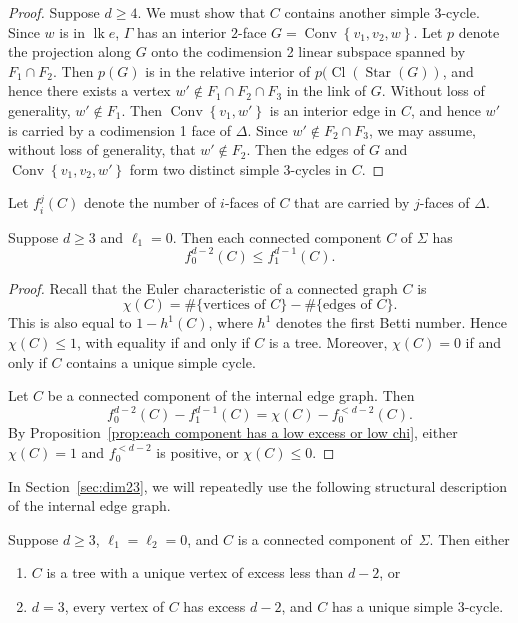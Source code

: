 \documentclass[ALCO,ThmDefs,Unicode,epreuves]{cedram}
\DeclareMathOperator{\Cl}{Cl}
\DeclareMathOperator{\Convop}{Conv}
\newcommand{\Conv}[1]{\Convop\left\{{#1}\right\}}
\DeclareMathOperator{\lk}{lk}
\DeclareMathOperator{\Star}{Star}
\begin{document}
\begin{proof}
Suppose $d \geq 4$. We must show that $C$ contains another simple $3$-cycle. 
Since $w$ is in $\lk e$, $\Gamma$ has an interior $2$-face $G = \Conv{v_1,v_2, w}$. 
Let $p$ denote the projection along $G$ onto the codimension 2 linear subspace spanned by 
$F_1 \cap F_2$. Then $p(G)$ is in the relative interior of $p(\Cl(\Star(G))$, and hence 
there exists a vertex $w' \notin F_1 \cap F_2 \cap F_3$ in the link of $G$. Without loss 
of generality, $w' \notin F_1$. Then $\Conv{v_1, w'}$ is an interior edge in $C$, and 
hence $w'$ is carried by a codimension 1 face of $\Delta$. Since $w' \notin F_2 \cap F_3$, 
we may assume, without loss of generality, that $w' \notin F_2$. Then the edges of $G$ 
and $\Conv{v_1, v_2, w'}$ form two distinct simple $3$-cycles in $C$. 
\end{proof}

Let $f_i^j(C)$ denote the number of $i$-faces of $C$ that are carried by $j$-faces of 
$\Delta$.

\begin{coro} \label{cor:non-negative}
Suppose $d \geq 3$ and $\ell_1 = 0$. Then each connected component $C$ of $\Sigma$ has
\[
f_0^{d-2}(C) \leq f_1^{d-1}(C).
\]
\end{coro}

\begin{proof}
Recall that the Euler characteristic of a connected graph $C$ is 
\[
\chi(C) = \# \{ \mbox{vertices of $C$}\} - \#\{ \mbox{edges of $C$} \}.
\]
This is also equal to $1 - h^1(C)$, where $h^1$ denotes the first Betti number. Hence $\chi(C) \leq 1$, with equality if and only if $C$ is a tree. Moreover, $\chi(C) = 0$ if and only if $C$ contains a unique simple cycle.

Let $C$ be a connected component of the internal edge graph. Then $$f_0^{d-2}(C) - f_1^{d-1}(C) = \chi(C) - f_0^{< d-2}(C).$$ By Proposition~\ref{prop:each component has a low excess or low chi}, either $\chi(C) = 1$ and $f_0^{< d-2}$ is positive, or $\chi(C) \leq 0$.
\end{proof}


In Section~\ref{sec:dim23}, we will repeatedly use the following structural description of the internal edge graph.

\begin{prop}\label{prop:components are trees or have cycles}
Suppose $d \geq 3$, $\ell_1=\ell_2 = 0$, and $C$ is a connected component of~$\Sigma$. Then either
\begin{enumerate}
\item $C$ is a tree with a unique vertex of excess less than $d-2$, or
\item $d=3$, every vertex of $C$ has excess $d-2$, and $C$ has a unique simple 3-cycle.
\end{enumerate}
\end{prop}
\end{document}
